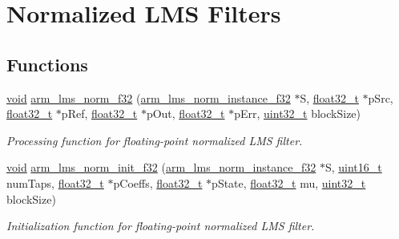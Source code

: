 \hypertarget{group___l_m_s___n_o_r_m}{\section{Normalized L\-M\-S Filters}
\label{group___l_m_s___n_o_r_m}
}
\subsection*{Functions}
\begin{DoxyCompactItemize}
\item 
\hyperlink{group___n_a_m_e_ga18028b8badbf1ea7e704ccac3c488e82}{void} \hyperlink{group___l_m_s___n_o_r_m_ga2418c929087c6eba719758eaae3f3300}{arm\-\_\-lms\-\_\-norm\-\_\-f32} (\hyperlink{structarm__lms__norm__instance__f32}{arm\-\_\-lms\-\_\-norm\-\_\-instance\-\_\-f32} $\ast$S, \hyperlink{arm__math_8h_a4611b605e45ab401f02cab15c5e38715}{float32\-\_\-t} $\ast$p\-Src, \hyperlink{arm__math_8h_a4611b605e45ab401f02cab15c5e38715}{float32\-\_\-t} $\ast$p\-Ref, \hyperlink{arm__math_8h_a4611b605e45ab401f02cab15c5e38715}{float32\-\_\-t} $\ast$p\-Out, \hyperlink{arm__math_8h_a4611b605e45ab401f02cab15c5e38715}{float32\-\_\-t} $\ast$p\-Err, \hyperlink{stdint_8h_a435d1572bf3f880d55459d9805097f62}{uint32\-\_\-t} block\-Size)
\begin{DoxyCompactList}\small\item\em Processing function for floating-\/point normalized L\-M\-S filter. \end{DoxyCompactList}\item 
\hyperlink{group___n_a_m_e_ga18028b8badbf1ea7e704ccac3c488e82}{void} \hyperlink{group___l_m_s___n_o_r_m_gac7ccbaea863882056eee815456464670}{arm\-\_\-lms\-\_\-norm\-\_\-init\-\_\-f32} (\hyperlink{structarm__lms__norm__instance__f32}{arm\-\_\-lms\-\_\-norm\-\_\-instance\-\_\-f32} $\ast$S, \hyperlink{stdint_8h_a273cf69d639a59973b6019625df33e30}{uint16\-\_\-t} num\-Taps, \hyperlink{arm__math_8h_a4611b605e45ab401f02cab15c5e38715}{float32\-\_\-t} $\ast$p\-Coeffs, \hyperlink{arm__math_8h_a4611b605e45ab401f02cab15c5e38715}{float32\-\_\-t} $\ast$p\-State, \hyperlink{arm__math_8h_a4611b605e45ab401f02cab15c5e38715}{float32\-\_\-t} mu, \hyperlink{stdint_8h_a435d1572bf3f880d55459d9805097f62}{uint32\-\_\-t} block\-Size)
\begin{DoxyCompactList}\small\item\em Initialization function for floating-\/point normalized L\-M\-S filter. \end{DoxyCompactList}\item 

\end{DoxyCompactItemize}
